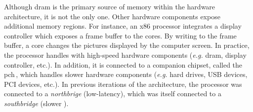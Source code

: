 Although \ac{dram} is the primary source of memory within the hardware
architecture, it is not the only one.
%
Other hardware components expose additional memory regions.
%
For instance, an x86 processor integrates a display controller which exposes a
frame buffer to the cores.
%
By writing to the frame buffer, a core changes the pictures displayed by the
computer screen.
%
In practice, the processor handles \IOs with high-speed hardware components
(\emph{e.g.} \ac{dram}, display controller, etc.).
%
In addition, it is connected to a companion chipset, called the
\ac{pch}\,\cite{turley2014introx86}, which handles slower hardware components
(\emph{e.g.}  hard drives, USB devices, PCI devices, etc.).
%
In previous iterations of the architecture, the processor was connected to a
\emph{northbrige} (low-latency), which was itself connected to a
\emph{southbridge} (slower \IOs).

